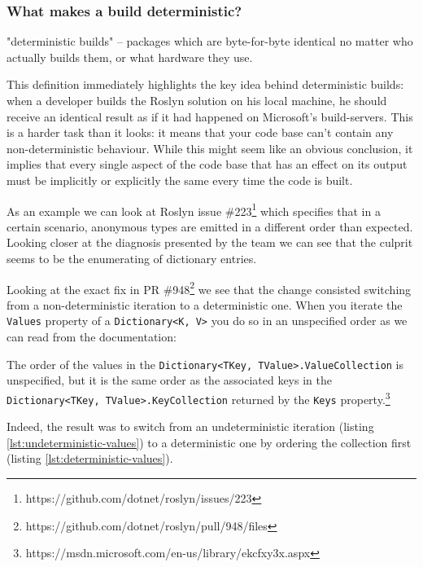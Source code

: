\subsubsection{What makes a build deterministic?}
\label{sec:deterministic-builds-what}

\begin{displayquote}
"deterministic builds" -- packages which are byte-for-byte identical no matter who actually builds them, or what hardware they use.\parencite{Perry2013} 
\end{displayquote}

\noindent This definition immediately highlights the key idea behind deterministic builds: when a developer builds the Roslyn solution on his local machine, he should receive an identical result as if it had happened on Microsoft's build-servers. This is a harder task than it looks: it means that your code base can't contain any non-deterministic behaviour. While this might seem like an obvious conclusion, it implies that every single aspect of the code base that has an effect on its output must be implicitly or explicitly the same every time the code is built. 

As an example we can look at Roslyn issue \#223\footnote{https://github.com/dotnet/roslyn/issues/223} which specifies that in a certain scenario, anonymous types are emitted in a different order than expected. Looking closer at the diagnosis presented by the team we can see that the culprit seems to be the enumerating of dictionary entries.

Looking at the exact fix in PR \#948\footnote{https://github.com/dotnet/roslyn/pull/948/files} we see that the change consisted switching from a non-deterministic iteration to a deterministic one. When you iterate the \verb|Values| property of a \verb|Dictionary<K, V>| you do so in an unspecified order as we can read from the documentation:

\begin{displayquote}
The order of the values in the \verb|Dictionary<TKey, TValue>.ValueCollection| is unspecified, but it is the same order as the associated keys in the \verb|Dictionary<TKey, TValue>.KeyCollection| returned by the \verb|Keys| property.\footnote{https://msdn.microsoft.com/en-us/library/ekcfxy3x.aspx}
\end{displayquote}

\noindent Indeed, the result was to switch from an undeterministic iteration (listing \ref{lst:undeterministic-values}) to a deterministic one by ordering the collection first (listing \ref{lst:deterministic-values}).

